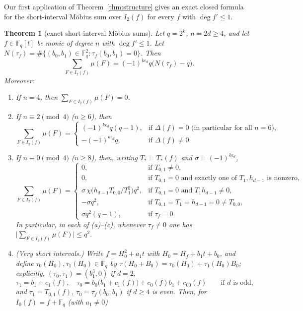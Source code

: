 \documentclass[11pt,a4paper]{amsart}
\newtheorem{theorem}{Theorem}[section]
\theoremstyle{remark}
\numberwithin{equation}{section}
\newcommand{\Fq}{\mathbb{F}_q}
\begin{document}
Our first application of Theorem~\ref{thm:structure} gives an exact closed formula for the short-interval M\"obius sum
over $I_2(f)$ for every $f$ with $\deg f'\le 1$.

\begin{theorem}[exact short-interval M\"obius sums]\label{thm:mobius-I2}
Let $q=2^k$, $n=2d\ge 4$, and let $f\in\Fq[t]$ be monic of degree $n$ with $\deg f'\le 1$. Let
$N(\tau_f)=\#\{(b_0,b_1)\in\Fq^2:\tau_f(b_0,b_1)=0\}$. Then
\begin{equation}\label{eq:mobius-master}
\sum_{F\in I_2(f)}\mu(F)=(-1)^{k\epsilon_d}q\bigl(N(\tau_f)-q\bigr).
\end{equation}
Moreover:
\begin{enumerate}
\item[(a)] If $n=4$, then $\sum_{F\in I_2(f)}\mu(F)=0$.
\item[(b)] If $n\equiv 2\pmod 4$ ($n\ge 6$), then
\[
\sum_{F\in I_2(f)}\mu(F)=\begin{cases}
(-1)^{k\epsilon_d}q(q-1), & \text{if }\Delta(f)=0\text{ (in particular for all }n=6\text{)},\\
-(-1)^{k\epsilon_d}q, & \text{if }\Delta(f)\ne 0.
\end{cases}
\]
\item[(c)] If $n\equiv 0\pmod 4$ ($n\ge 8$), then, writing $T_*=T_*(f)$ and $\sigma=(-1)^{k\epsilon_d}$,
\[
\sum_{F\in I_2(f)}\mu(F)=\begin{cases}
0, & \text{if }T_{0,1}\ne 0,\\
0, & \text{if }T_{0,1}=0\text{ and exactly one of }T_1,h_{d-1}\text{ is nonzero},\\
\sigma\,\chi\bigl(h_{d-1}T_{0,0}/T_1^2\bigr)q^2, & \text{if }T_{0,1}=0\text{ and }T_1h_{d-1}\ne 0,\\
-\sigma q^2, & \text{if }T_{0,1}=T_1=h_{d-1}=0\ne T_{0,0},\\
\sigma q^2(q-1), & \text{if }\tau_f=0.
\end{cases}
\]
In particular, in each of \textup{(a)}--\textup{(c)}, whenever $\tau_f\ne 0$ one has
$\bigl|\sum_{F\in I_2(f)}\mu(F)\bigr|\le q^2$.
\item[(d)] (\emph{Very short intervals.}) Write $f=H_0^2+a_1t$ with $H_0=H_f+b_1t+b_0$, and define
$\tau_0(H_0),\tau_1(H_0)\in\Fq$ by $\tau(H_0+B_0)=\tau_0(H_0)+\tau_1(H_0)B_0$; explicitly,
$(\tau_0,\tau_1)=(b_1^3,0)$ if $d=2$,
\[
\tau_1=b_1+c_1(f),\quad \tau_0=b_0\bigl(b_1+c_1(f)\bigr)+c_0(f)b_1+c_{00}(f)\qquad\text{if $d$ is odd},
\]
and $\tau_1=T_{0,1}(f)$, $\tau_0=\tau_f(b_0,b_1)$ if $d\ge 4$ is even. Then, for $I_0(f)=f+\Fq$ (with $a_1\ne 0$)

\end{enumerate}
\end{theorem}
\end{document}
